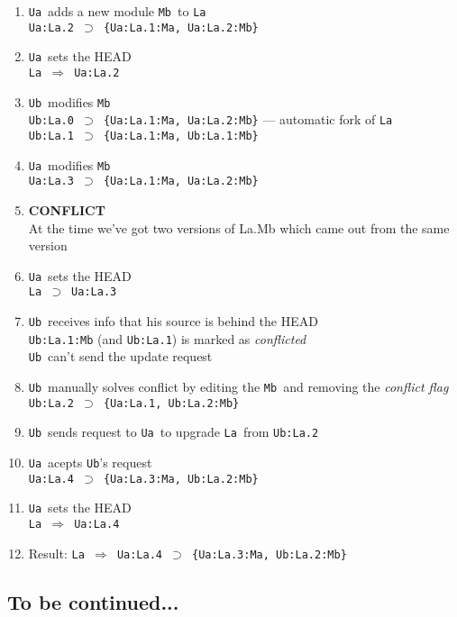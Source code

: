 \documentclass[10pt]{article}
\def\Ua{{\tt Ua}}
\def\Ub{{\tt Ub}}
\def\La{{\tt La}}
\def\Mb{{\tt Mb}}
\def\headsto{${\Longrightarrow}$ }
\def\hto{\headsto}
\def\eq{${\supset}$ }
\begin{document}
		\begin{enumerate}
			\item{\Ua\ adds a new module \Mb\ to \La\\
            		{\tt Ua:La.2 \eq \{Ua:La.1:Ma, Ua:La.2:Mb\}}
			}
			\item{\Ua\ sets the HEAD\\
				{\tt La \hto Ua:La.2}
			}
			\item{\Ub\ modifies \Mb\\
				{\tt Ub:La.0 \eq \{Ua:La.1:Ma, Ua:La.2:Mb\}} --- automatic fork of \La\\
				{\tt Ub:La.1 \eq \{Ua:La.1:Ma, Ub:La.1:Mb\}}
			}
			\item{\Ua\ modifies \Mb\\
				{\tt Ua:La.3 \eq \{Ua:La.1:Ma, Ua:La.2:Mb\}}
			}
			\item{{\bf CONFLICT}\\
            		At the time we've got two versions of La.Mb which came out from the same version
            	}
            	\item{\Ua\ sets the HEAD\\
            		{\tt La \eq Ua:La.3}
            	}
            	\item{\Ub\ receives info that his source is behind the HEAD\\
				{\tt Ub:La.1:Mb} (and {\tt Ub:La.1}) is marked as {\em conflicted}\\
				\Ub\ can't send the update request
			}
			\item{\Ub\ manually solves conflict by editing the \Mb\ and removing the {\em conflict flag}\\
				{\tt Ub:La.2 \eq \{Ua:La.1, Ub:La.2:Mb\}}
			}
			\item{\Ub\ sends request to \Ua\ to upgrade \La\ from {\tt Ub:La.2}}
			\item{\Ua\ acepts \Ub's request\\
				{\tt Ua:La.4 \eq \{Ua:La.3:Ma, Ub:La.2:Mb\}}
			}
			\item{\Ua\ sets the HEAD\\
				{\tt La \hto Ua:La.4}
			}
			\item{Result: {\tt La \hto Ua:La.4 \eq \{Ua:La.3:Ma, Ub:La.2:Mb\}}}
		\end{enumerate}
		
	\subsection*{To be continued...}
\end{document}
